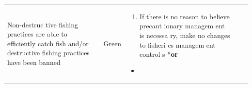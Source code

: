 \documentclass[]{book}
\providecommand{\tightlist}{%
  \setlength{\itemsep}{0pt}\setlength{\parskip}{0pt}}
\begin{document}
\begin{longtable}[]{@{}lllll@{}}
\begin{minipage}[t]{0.19\columnwidth}
Non-destruc tive fishing practices are able to efficiently catch fish
and/or destructive fishing practices have been banned\strut
\end{minipage} & \begin{minipage}[t]{0.19\columnwidth}\raggedright\strut
Green\strut
\end{minipage} & \begin{minipage}[t]{0.19\columnwidth}\raggedright\strut
\begin{enumerate}
\def\labelenumi{\arabic{enumi}.}
\tightlist
\item
  If there is no reason to believe precaut ionary managem ent is necessa
  ry, make no changes to fisheri es managem ent control s *\textbf{or}
\end{enumerate}

\begin{itemize}
\item
\end{itemize}


\end{minipage}
\end{longtable}
\end{document}
